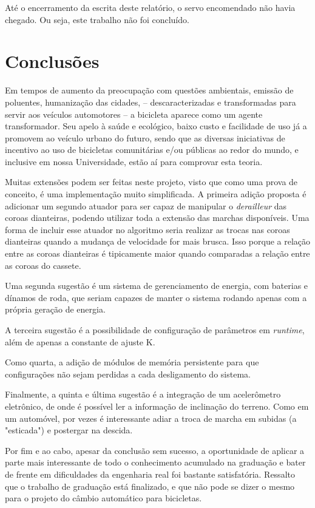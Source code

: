 \documentclass[a4paper,11pt]{article}
\begin{document}
Até o encerramento da escrita deste relatório, o servo encomendado não havia
chegado. Ou seja, este trabalho não foi concluído.



\pagebreak
%
\section{Conclusões}
\label{sec:conclusoes}

Em tempos de aumento da preocupação com questões ambientais, emissão de
poluentes, humanização das cidades, -- descaracterizadas e transformadas para
servir aos veículos automotores -- a bicicleta aparece como um agente
transformador. Seu apelo à saúde e ecológico, baixo custo e facilidade de uso
já a promovem ao veículo urbano do futuro, sendo que as diversas iniciativas de
incentivo ao uso de bicicletas comunitárias e/ou públicas ao redor do mundo, e
inclusive em nossa Universidade, estão aí para comprovar esta teoria. 

Muitas extensões podem ser feitas neste projeto, visto que como uma prova de
conceito, é uma implementação muito simplificada. A primeira adição proposta
é adicionar um segundo atuador para ser capaz de manipular o
\textit{derailleur} das coroas dianteiras, podendo utilizar toda a extensão das
marchas disponíveis. Uma forma de incluir esse atuador no algoritmo seria
realizar as trocas nas coroas dianteiras quando a mudança de velocidade for
mais brusca. Isso porque a relação entre as coroas dianteiras é tipicamente
maior quando comparadas a relação entre as coroas do cassete.

Uma segunda sugestão é um sistema de gerenciamento de energia, com baterias e
dínamos de roda, que seriam capazes de manter o sistema rodando apenas com a
própria geração de energia.

A terceira sugestão é a possibilidade de configuração de parâmetros em
\textit{runtime}, além de apenas a constante de ajuste K.

Como quarta, a adição de módulos de memória persistente para
que configurações não sejam perdidas a cada desligamento do sistema.

Finalmente, a quinta e última sugestão é a integração de um acelerômetro
eletrônico, de onde é possível ler a informação de inclinação do terreno. Como
em um automóvel, por vezes é interessante adiar a troca de marcha em subidas (a
"esticada") e postergar na descida.

Por fim e ao cabo, apesar da conclusão sem sucesso, a oportunidade de aplicar a
parte mais interessante de todo o conhecimento acumulado na graduação e bater
de frente em dificuldades da engenharia real foi bastante satisfatória.
Ressalto que o trabalho de graduação está finalizado, e que não pode se dizer o
mesmo para o projeto do câmbio automático para bicicletas.
\end{document}
